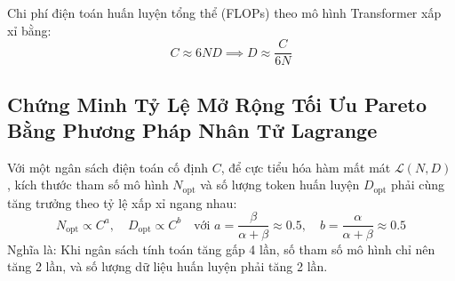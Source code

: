 Chi phí điện toán huấn luyện tổng thể (FLOPs) theo mô hình Transformer xấp xỉ bằng:
\begin{equation}
C \approx 6 N D \implies D \approx \frac{C}{6 N}
\end{equation}

\subsection{Chứng Minh Tỷ Lệ Mở Rộng Tối Ưu Pareto Bằng Phương Pháp Nhân Tử Lagrange}

\begin{theorem}
Với một ngân sách điện toán cố định $C$, để cực tiểu hóa hàm mất mát $\mathcal{L}(N, D)$, kích thước tham số mô hình $N_{\text{opt}}$ và số lượng token huấn luyện $D_{\text{opt}}$ phải cùng tăng trưởng theo tỷ lệ xấp xỉ ngang nhau:
\begin{equation}
N_{\text{opt}} \propto C^a, \quad D_{\text{opt}} \propto C^b \quad \text{với } a = \frac{\beta}{\alpha + \beta} \approx 0.5, \quad b = \frac{\alpha}{\alpha + \beta} \approx 0.5
\end{equation}
Nghĩa là: Khi ngân sách tính toán tăng gấp 4 lần, số tham số mô hình chỉ nên tăng 2 lần, và số lượng dữ liệu huấn luyện phải tăng 2 lần.
\end{theorem}

